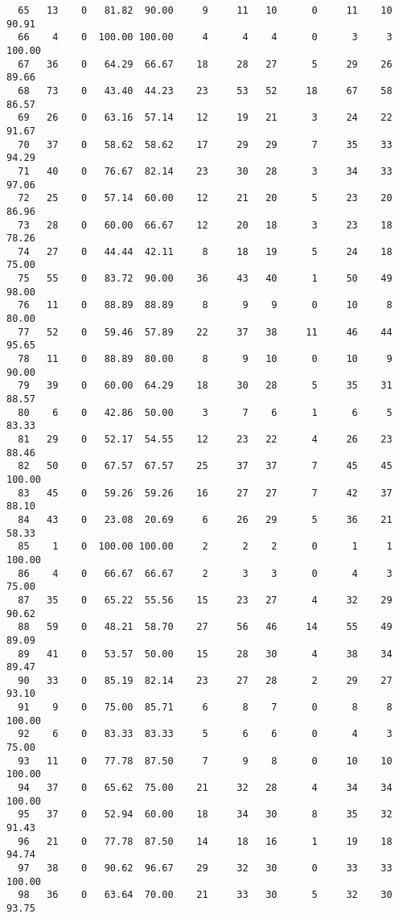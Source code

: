 \begin{verbatim}
  65   13    0   81.82  90.00     9     11   10      0     11    10    90.91
  66    4    0  100.00 100.00     4      4    4      0      3     3   100.00
  67   36    0   64.29  66.67    18     28   27      5     29    26    89.66
  68   73    0   43.40  44.23    23     53   52     18     67    58    86.57
  69   26    0   63.16  57.14    12     19   21      3     24    22    91.67
  70   37    0   58.62  58.62    17     29   29      7     35    33    94.29
  71   40    0   76.67  82.14    23     30   28      3     34    33    97.06
  72   25    0   57.14  60.00    12     21   20      5     23    20    86.96
  73   28    0   60.00  66.67    12     20   18      3     23    18    78.26
  74   27    0   44.44  42.11     8     18   19      5     24    18    75.00
  75   55    0   83.72  90.00    36     43   40      1     50    49    98.00
  76   11    0   88.89  88.89     8      9    9      0     10     8    80.00
  77   52    0   59.46  57.89    22     37   38     11     46    44    95.65
  78   11    0   88.89  80.00     8      9   10      0     10     9    90.00
  79   39    0   60.00  64.29    18     30   28      5     35    31    88.57
  80    6    0   42.86  50.00     3      7    6      1      6     5    83.33
  81   29    0   52.17  54.55    12     23   22      4     26    23    88.46
  82   50    0   67.57  67.57    25     37   37      7     45    45   100.00
  83   45    0   59.26  59.26    16     27   27      7     42    37    88.10
  84   43    0   23.08  20.69     6     26   29      5     36    21    58.33
  85    1    0  100.00 100.00     2      2    2      0      1     1   100.00
  86    4    0   66.67  66.67     2      3    3      0      4     3    75.00
  87   35    0   65.22  55.56    15     23   27      4     32    29    90.62
  88   59    0   48.21  58.70    27     56   46     14     55    49    89.09
  89   41    0   53.57  50.00    15     28   30      4     38    34    89.47
  90   33    0   85.19  82.14    23     27   28      2     29    27    93.10
  91    9    0   75.00  85.71     6      8    7      0      8     8   100.00
  92    6    0   83.33  83.33     5      6    6      0      4     3    75.00
  93   11    0   77.78  87.50     7      9    8      0     10    10   100.00
  94   37    0   65.62  75.00    21     32   28      4     34    34   100.00
  95   37    0   52.94  60.00    18     34   30      8     35    32    91.43
  96   21    0   77.78  87.50    14     18   16      1     19    18    94.74
  97   38    0   90.62  96.67    29     32   30      0     33    33   100.00
  98   36    0   63.64  70.00    21     33   30      5     32    30    93.75

\end{verbatim}
